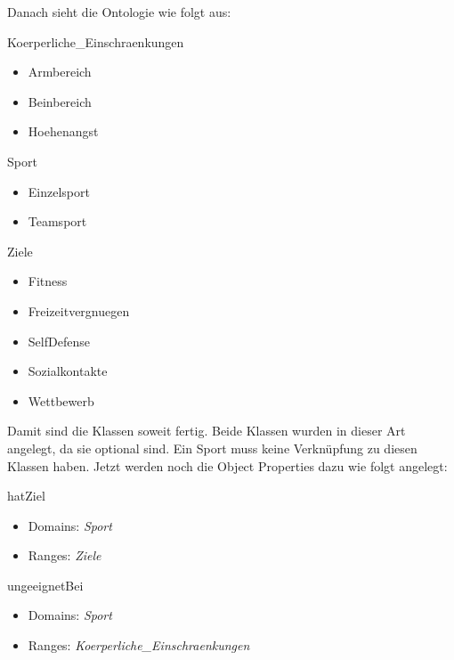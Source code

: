 Danach sieht die Ontologie wie folgt aus:
\begin{capitemize}
	\item Koerperliche\_Einschraenkungen
		\begin{itemize}
				\item Armbereich
				\item Beinbereich
				\item Hoehenangst
		\end{itemize}
	\item Sport
		\begin{itemize}
			\item Einzelsport
			\item Teamsport
		\end{itemize}
	\item Ziele
		\begin{itemize}
				\item Fitness
				\item Freizeitvergnuegen
				\item SelfDefense
				\item Sozialkontakte
				\item Wettbewerb
		\end{itemize}
\end{capitemize}

Damit sind die Klassen soweit fertig. Beide Klassen wurden in dieser Art angelegt, da sie optional sind. Ein Sport muss keine Verkn\"upfung zu diesen Klassen haben.  Jetzt werden noch die Object Properties dazu wie folgt angelegt: 

\begin{capitemize}
	\item hatZiel
		\begin{itemize}
			\item Domains: \textit{Sport}
			\item Ranges: \textit{Ziele}
		\end{itemize}
	\item ungeeignetBei
		\begin{itemize}
			\item Domains: \textit{Sport}
			\item Ranges: \textit{Koerperliche\_Einschraenkungen}
		\end{itemize}
\end{capitemize}

